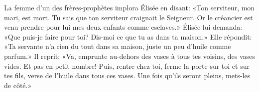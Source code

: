La femme d’un des frères-prophètes implora Élisée en disant:
	«Ton serviteur, mon mari, est mort.
	Tu sais que ton serviteur craignait le Seigneur.
Or le créancier est venu prendre pour lui mes deux enfants comme esclaves.»
Élisée lui demanda:
		«Que puis-je faire pour toi?
	Dis-moi ce que tu as dans ta maison.»
Elle répondit: «Ta servante n’a rien du tout dans sa maison,
	juste un peu d’huile comme parfum.»
Il reprit: «Va, emprunte au-dehors des vases à tous tes voisins, des vases vides.
	Et pas en petit nombre!
	Puis, rentre chez toi, ferme la porte sur toi et sur tes fils,
	verse de l’huile dans tous ces vases.
Une fois qu’ils seront pleins, mets-les de côté.»
